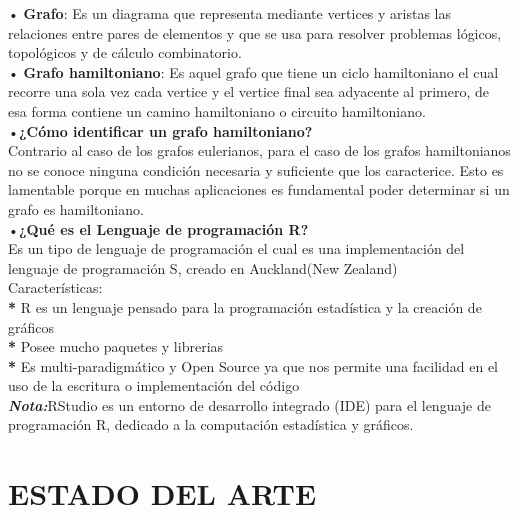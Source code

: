 \documentclass[journal]{IEEEtran}
\begin{document}
• \textbf{Grafo}: Es un diagrama que representa mediante vertices y aristas las relaciones entre pares de elementos y que se usa para resolver problemas l{\'o}gicos, topol{\'o}gicos y de c{\'a}lculo combinatorio.\\

\vspace{0.2mm}
• \textbf{Grafo hamiltoniano}: Es aquel grafo que tiene un ciclo hamiltoniano el cual recorre una sola vez cada vertice y el vertice final sea adyacente al primero, de esa forma contiene un camino hamiltoniano o circuito hamiltoniano.\\


•\textbf{¿{C{\'o}mo identificar un grafo hamiltoniano}?}\\
Contrario al caso de los grafos eulerianos, para el caso de los grafos hamiltonianos no se conoce ninguna condici{\'o}n necesaria y suficiente que los caracterice. Esto es lamentable porque en muchas aplicaciones es fundamental poder determinar si un grafo es hamiltoniano.\\

\vspace{0.2mm}
•\textbf{¿{Qu{\'e} es el Lenguaje de programaci{\'o}n R}?}\\

Es un tipo de lenguaje de programaci{\'o}n el cual es una implementaci{\'o}n del lenguaje de programaci{\'o}n S, creado en Auckland(New Zealand)\\

Caracter{\'i}sticas:\\
\textbf{*} R es un lenguaje pensado para la programaci{\'o}n estad{\'i}stica y la creaci{\'o}n de gr{\'a}ficos\\
\textbf{*} Posee mucho paquetes y librerias\\
\textbf{*} Es multi-paradigm{\'a}tico y Open Source ya que nos permite una facilidad en el uso de la escritura o implementaci{\'o}n del c{\'o}digo\\
\textit{\textbf{Nota:}}RStudio es un entorno de desarrollo integrado (IDE) para el lenguaje de programación R, dedicado a la computación estadística y gráficos.\\


 
\section{\large\bf ESTADO DEL ARTE}
\end{document}
